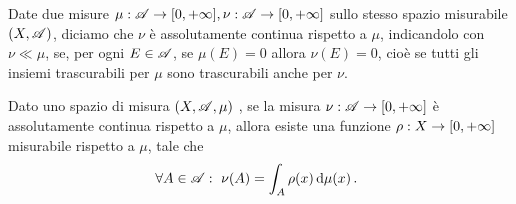 \begin{definition}\label{def:AssolutamenteContinua}
	Date due misure $\mu:\mathscr A\to[0,+\infty],\nu:\mathscr A\to[0,+\infty]$ sullo stesso spazio misurabile $(X,\mathscr A)$, diciamo che $\nu$ è assolutamente continua rispetto a $\mu$, indicandolo con $\nu\ll\mu$, se, per ogni $E\in\mathscr A$, se $\mu(E)=0$ allora $\nu(E)=0$, cioè se tutti gli insiemi trascurabili per $\mu$ sono trascurabili anche per $\nu$.
\end{definition}

\begin{theorem} \label{thm:RadonNikodym}
	Dato uno spazio di misura $(X,\mathscr A,\mu)$ \sigfin[o], se la misura $\nu:\mathscr A\to[0,+\infty]$ è assolutamente continua rispetto a $\mu$, allora esiste una funzione $\rho:X\to[0,+\infty]$ misurabile rispetto a $\mu$, tale che
	\begin{equation*}
		\forall A\in\mathscr A:\ \nu(A)=\int_A \rho(x)\,\mathrm d\mu(x)\, \text{. }
	\end{equation*}
\end{theorem}

